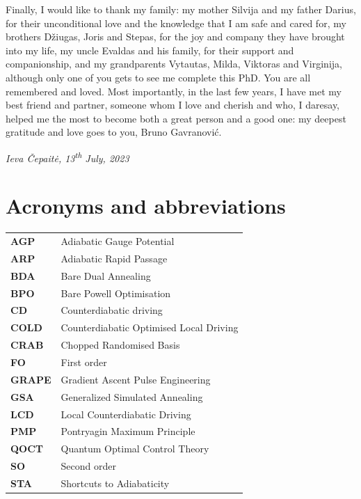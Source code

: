 \documentclass[a4paper,oneside,11pt]{book}
\begin{document}
Finally, I would like to thank my family: my mother Silvija and my father Darius, for their unconditional love and the knowledge that I am safe and cared for, my brothers Džiugas, Joris and Stepas, for the joy and company they have brought into my life, my uncle Evaldas and his family, for their support and companionship, and my grandparents Vytautas, Milda, Viktoras and Virginija, although only one of you gets to see me complete this PhD. You are all remembered and loved. Most importantly, in the last few years, I have met my best friend and partner, someone whom I love and cherish and who, I daresay, helped me the most to become both a great person and a good one: my deepest gratitude and love goes to you, Bruno Gavranović.

\begin{flushright}
\emph{Ieva \v{C}epait\.{e}, 13\textsuperscript{th} July, 2023}
\end{flushright}

\chapter{Acronyms and abbreviations}

\begin{table}[h]
      \begin{tabular}{p{3cm}  p{8cm}}

        \textbf{AGP}\label{acr:AGP} & Adiabatic Gauge Potential \\ [7pt]
        \textbf{ARP}\label{acr:ARP} & Adiabatic Rapid Passage \\ [7pt]
        \textbf{BDA}\label{acr:BDA} & Bare Dual Annealing \\[7pt]
        \textbf{BPO}\label{acr:BPO} & Bare Powell Optimisation \\[7pt]
        \textbf{CD}\label{acr:CD} & Counterdiabatic driving \\[7pt]
        \textbf{COLD}\label{acr:COLD} & Counterdiabatic Optimised Local Driving \\[7pt]
        \textbf{CRAB}\label{acr:CRAB} & Chopped Randomised Basis \\ [7pt]
        \textbf{FO}\label{acr:FO} & First order \\ [7pt]
        \textbf{GRAPE}\label{acr:GRAPE} & Gradient Ascent Pulse Engineering \\ [7pt]
        \textbf{GSA}\label{acr:GSA} & Generalized Simulated Annealing \\ [7pt]
        \textbf{LCD}\label{acr:LCD} & Local Counterdiabatic Driving \\[7pt]
        \textbf{PMP}\label{acr:PMP} & Pontryagin Maximum Principle \\[7pt]
        \textbf{QOCT}\label{acr:QOCT} & Quantum Optimal Control Theory \\[7pt]
        \textbf{SO}\label{acr:SO} & Second order \\ [7pt]
        \textbf{STA}\label{acr:STA} & Shortcuts to Adiabaticity \\[7pt]

    \end{tabular}

\end{table}\label{table}
\end{document}
